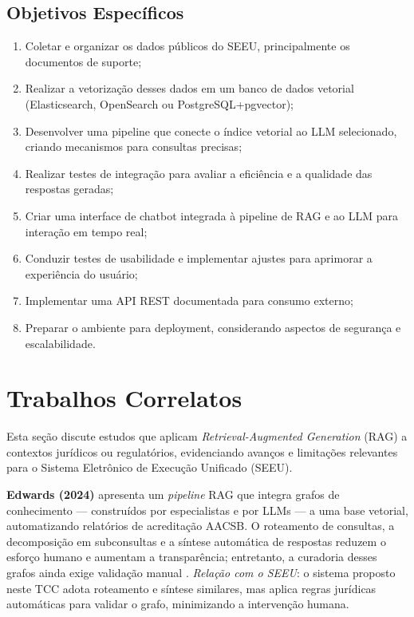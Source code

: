 \subsection{Objetivos Específicos}
\begin{enumerate}[label=\arabic*.]
  \item Coletar e organizar os dados públicos do SEEU, principalmente os documentos de suporte;
  \item Realizar a vetorização desses dados em um banco de dados vetorial (Elasticsearch, OpenSearch ou PostgreSQL+pgvector);
  \item Desenvolver uma pipeline que conecte o índice vetorial ao LLM selecionado, criando mecanismos para consultas precisas;
  \item Realizar testes de integração para avaliar a eficiência e a qualidade das respostas geradas;
  \item Criar uma interface de chatbot integrada à pipeline de RAG e ao LLM para interação em tempo real;
  \item Conduzir testes de usabilidade e implementar ajustes para aprimorar a experiência do usuário;
  \item Implementar uma API REST documentada para consumo externo;
  \item Preparar o ambiente para deployment, considerando aspectos de segurança e escalabilidade.
\end{enumerate}


\section{Trabalhos Correlatos}
\label{sec:trabalhos-correlatos}

Esta seção discute estudos que aplicam \textit{Retrieval-Augmented Generation} (RAG) a contextos jurídicos ou regulatórios, evidenciando avanços e limitações relevantes para o Sistema Eletrônico de Execução Unificado (SEEU).

\textbf{Edwards (2024)} apresenta um \textit{pipeline} RAG que integra grafos de conhecimento — construídos por especialistas e por LLMs — a uma base vetorial, automatizando relatórios de acreditação AACSB. O roteamento de consultas, a decomposição em subconsultas e a síntese automática de respostas reduzem o esforço humano e aumentam a transparência; entretanto, a curadoria desses grafos ainda exige validação manual \cite{edwards2024hybrid}.  
\emph{Relação com o SEEU}: o sistema proposto neste TCC adota roteamento e síntese similares, mas aplica regras jurídicas automáticas para validar o grafo, minimizando a intervenção humana.

